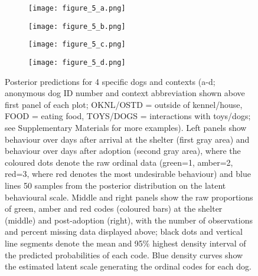 \documentclass[fleqn,10pt]{wlscirep}
\begin{document}
\begin{figure}[t!]
  \centering
  \begin{subfigure}{1\textwidth}
    \centering
    \texttt{[image: figure\_5\_a.png]}
  \end{subfigure}
  \begin{subfigure}{1\textwidth}
    \centering
    \vspace{-0.6cm}
    \texttt{[image: figure\_5\_b.png]}
  \end{subfigure}
  \begin{subfigure}{1\textwidth}
    \centering
    \vspace{-0.6cm}
    \texttt{[image: figure\_5\_c.png]}
  \end{subfigure}
  \begin{subfigure}{1\textwidth}
    \centering
    \vspace{-0.6cm}
    \texttt{[image: figure\_5\_d.png]}
  \end{subfigure}%
  \caption{
  Posterior predictions for 4 specific dogs and contexts (a-d; anonymous dog ID number and context abbreviation shown above first panel of each plot; OKNL/OSTD = outside of kennel/house, FOOD = eating food, TOYS/DOGS = interactions with toys/dogs; see Supplementary Materials for more examples). Left panels show behaviour over days after arrival at the shelter (first gray area) and behaviour over days after adoption (second gray area), where the coloured dots denote the raw ordinal data (green=1, amber=2, red=3, where red denotes the most undesirable behaviour) and blue lines 50 samples from the posterior distribution on the latent behavioural scale. Middle and right panels show the raw proportions of green, amber and red codes (coloured bars) at the shelter (middle) and post-adoption (right), with the number of observations and percent missing data displayed above; black dots and vertical line segments denote the mean and 95\% highest density interval of the predicted probabilities of each code. Blue density curves show the estimated latent scale generating the ordinal codes for each dog.}
  \label{fig_pps}
\end{figure}
\end{document}
